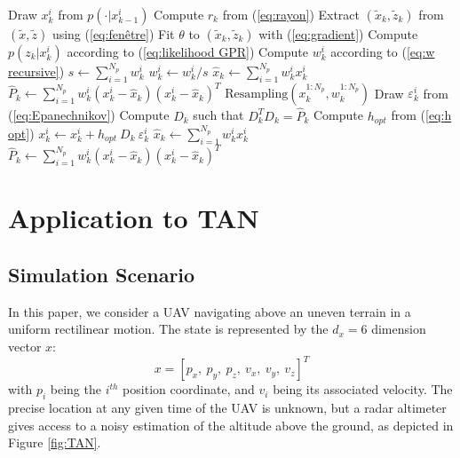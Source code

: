 \documentclass[conference]{IEEEtran}
\begin{document}
\begin{algorithm}
\begin{algorithmic}
\State Draw $x_k^i$ from $p(\cdot|x_{k-1}^i)$ 
\EndFor
\State Compute $r_k$ from (\ref{eq:rayon}) 
\State Extract $(\tilde{x}_k,\tilde{z}_k)$ from $(\tilde{x},\tilde{z})$ using (\ref{eq:fenêtre})
\State Fit $\theta$ to $(\tilde{x}_k,\tilde{z}_k)$ with (\ref{eq:gradient}) 
\State Compute $p(z_k|x_k^i)$ according to (\ref{eq:likelihood GPR}) 
\State Compute $w_k^i$ according to (\ref{eq:w recursive}) 
\EndFor
\State $s \gets \sum_{i=1}^{N_p} w_k^i$
\State $w_k^i \gets w_k^i / s$ 
\EndFor
\State $\hat x_k \gets \sum_{i=1}^{N_p} w_k^i x_k^i$ 
\State $\hat P_k \gets \sum_{i=1}^{N_p} w_k^i (x_k^i - \hat x_k) (x_k^i - \hat x_k)^T$
\If{(\ref{eq:resampling})}
\State $\text{Resampling}\left(x_k^{1:N_p},w_k^{1:N_p}\right)$ 
\State Draw $\varepsilon_k^i$ from (\ref{eq:Epanechnikov}) 
\State Compute $D_k$ such that $D_k^T D_k = \hat P_k$
\State Compute $h_{opt}$ from (\ref{eq:h opt})
\State $x_k^i \gets x_k^i + h_{opt}\:D_k\:\varepsilon_k^i$
\EndFor
\State $\hat x_k \gets \sum_{i=1}^{N_p} w_k^i x_k^i$ 
\State $\hat P_k \gets \sum_{i=1}^{N_p} w_k^i (x_k^i - \hat x_k) (x_k^i - \hat x_k)^T$
\EndIf
\end{algorithmic} \caption{AK-RPF} \label{alg:AK-RPF}
\end{algorithm}

\section{Application to TAN}

\subsection{Simulation Scenario}

In this paper, we consider a UAV navigating above an uneven terrain in a uniform rectilinear motion. The state is represented by the $d_x = 6$ dimension vector $x$:
\begin{equation}
x = [p_x, \: p_y, \: p_z, \: v_x, \: v_y, \: v_z]^T \label{eq:x}
\end{equation}
with $p_i$ being the $i^{th}$ position coordinate, and $v_i$ being its associated velocity. The precise location at any given time of the UAV is unknown, but a radar altimeter gives access to a noisy estimation of the altitude above the ground, as depicted in Figure \ref{fig:TAN}.
\end{document}
